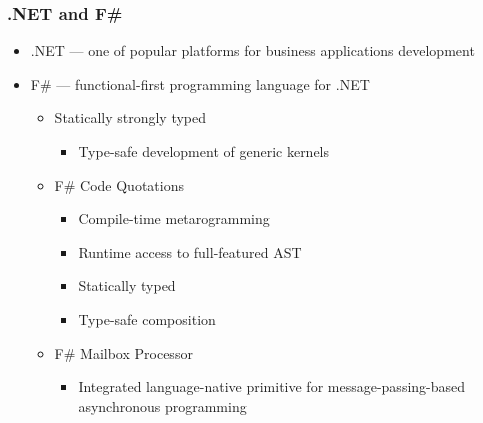 \documentclass[xcolor=table,aspectratio=169]{beamer}
\begin{document}
\begin{frame}[fragile]
  \frametitle{.NET and F\#}
  \begin{itemize}
      \item .NET --- one of popular platforms for business applications development
      \item F\# --- functional-first programming language for .NET
      \begin{itemize}
        \item Statically strongly typed
        \begin{itemize}
          \item Type-safe development of generic kernels
        \end{itemize}
        \item F\# Code Quotations
        \begin{itemize}
          \item Compile-time metarogramming
          \item Runtime access to full-featured AST
          \item Statically typed
          \item Type-safe composition 
        \end{itemize}  
        \item F\# Mailbox Processor
        \begin{itemize}
          \item Integrated language-native primitive for message-passing-based asynchronous programming
        \end{itemize}
      \end{itemize}
    \end{itemize}
\end{frame}
\end{document}
